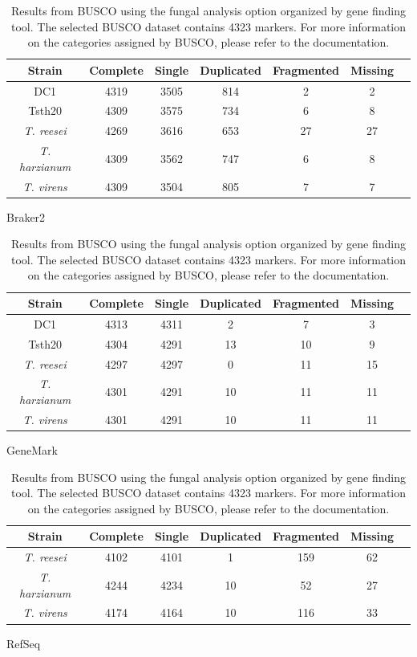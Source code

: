 \begin{table}
  \begin{center}
    \begin{subtable}{\textwidth}
      \centering
      \begin{tabular}{|c|c|c|c|c|c|c|}
        \hline
        Strain & Complete & Single & Duplicated & Fragmented & Missing \\ \hline
        DC1 & 4319 & 3505 & 814 & 2 & 2 \\ \hline
        Tsth20 & 4309 & 3575 & 734 & 6 & 8 \\ \hline
        \textit{T. reesei} & 4269 & 3616 & 653 & 27 & 27 \\ \hline
        \textit{T. harzianum} & 4309 & 3562 & 747 & 6 & 8 \\ \hline
        \textit{T. virens} & 4309 & 3504 & 805 & 7 & 7 \\ \hline
      \end{tabular}
      \caption{Braker2}
      \vspace{0.5cm}
    \end{subtable}
    \begin{subtable}{\textwidth}
      \centering
      \begin{tabular}{|c|c|c|c|c|c|c|}
        \hline
        Strain & Complete & Single & Duplicated & Fragmented & Missing \\ \hline
        DC1 & 4313 & 4311 & 2 & 7 & 3 \\ \hline
        Tsth20 & 4304 & 4291 & 13 & 10 & 9 \\ \hline
        \textit{T. reesei} & 4297 & 4297 & 0 & 11 & 15 \\ \hline
        \textit{T. harzianum} & 4301 & 4291 & 10 & 11 & 11 \\ \hline
        \textit{T. virens} & 4301 & 4291 & 10 & 11 & 11 \\ \hline
      \end{tabular}
      \caption{GeneMark}
      \vspace{0.5cm}
    \end{subtable}
    \begin{subtable}{\textwidth}
      \centering
      \begin{tabular}{|c|c|c|c|c|c|c|}
        \hline
        Strain & Complete & Single & Duplicated & Fragmented & Missing \\ \hline
        \textit{T. reesei} & 4102 & 4101 & 1 & 159 & 62 \\ \hline
        \textit{T. harzianum} & 4244 & 4234 & 10 & 52 & 27 \\ \hline
        \textit{T. virens} & 4174 & 4164 & 10 & 116 & 33 \\ \hline  
      \end{tabular}
      \caption{RefSeq}
    \end{subtable}
  \end{center}
  \caption{Results from BUSCO using the fungal analysis option
    organized by gene finding tool. The selected BUSCO dataset
    contains 4323 markers. For more information on the categories
    assigned by BUSCO, please refer to the documentation.}
  \label{table:busco}
\end{table}

